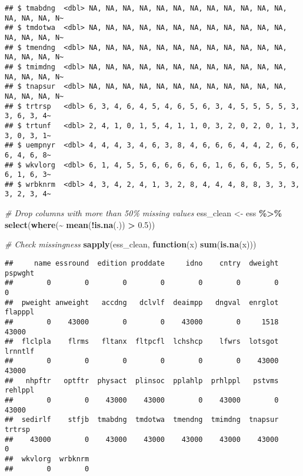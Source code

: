 \documentclass[
]{article}
\newenvironment{Shaded}{\begin{snugshade}}{\end{snugshade}}
\newcommand{\CommentTok}[1]{\textcolor[rgb]{0.56,0.35,0.01}{\textit{#1}}}
\newcommand{\ControlFlowTok}[1]{\textcolor[rgb]{0.13,0.29,0.53}{\textbf{#1}}}
\newcommand{\FloatTok}[1]{\textcolor[rgb]{0.00,0.00,0.81}{#1}}
\newcommand{\FunctionTok}[1]{\textcolor[rgb]{0.13,0.29,0.53}{\textbf{#1}}}
\newcommand{\NormalTok}[1]{#1}
\newcommand{\OtherTok}[1]{\textcolor[rgb]{0.56,0.35,0.01}{#1}}
\newcommand{\SpecialCharTok}[1]{\textcolor[rgb]{0.81,0.36,0.00}{\textbf{#1}}}
\begin{document}
\begin{verbatim}
## $ tmabdng  <dbl> NA, NA, NA, NA, NA, NA, NA, NA, NA, NA, NA, NA, NA, NA, NA, N~
## $ tmdotwa  <dbl> NA, NA, NA, NA, NA, NA, NA, NA, NA, NA, NA, NA, NA, NA, NA, N~
## $ tmendng  <dbl> NA, NA, NA, NA, NA, NA, NA, NA, NA, NA, NA, NA, NA, NA, NA, N~
## $ tmimdng  <dbl> NA, NA, NA, NA, NA, NA, NA, NA, NA, NA, NA, NA, NA, NA, NA, N~
## $ tnapsur  <dbl> NA, NA, NA, NA, NA, NA, NA, NA, NA, NA, NA, NA, NA, NA, NA, N~
## $ trtrsp   <dbl> 6, 3, 4, 6, 4, 5, 4, 6, 5, 6, 3, 4, 5, 5, 5, 5, 3, 3, 6, 3, 4~
## $ trtunf   <dbl> 2, 4, 1, 0, 1, 5, 4, 1, 1, 0, 3, 2, 0, 2, 0, 1, 3, 3, 0, 3, 1~
## $ uempnyr  <dbl> 4, 4, 4, 3, 4, 6, 3, 8, 4, 6, 6, 6, 4, 4, 2, 6, 6, 6, 4, 6, 8~
## $ wkvlorg  <dbl> 6, 1, 4, 5, 5, 6, 6, 6, 6, 6, 1, 6, 6, 6, 5, 5, 6, 6, 1, 6, 3~
## $ wrbknrm  <dbl> 4, 3, 4, 2, 4, 1, 3, 2, 8, 4, 4, 4, 8, 8, 3, 3, 3, 3, 2, 3, 4~
\end{verbatim}

\begin{Shaded}
\begin{Highlighting}[]
\CommentTok{\# Drop columns with more than 50\% missing values}
\NormalTok{ess\_clean }\OtherTok{\textless{}{-}}\NormalTok{ ess }\SpecialCharTok{\%\textgreater{}\%} \FunctionTok{select}\NormalTok{(}\FunctionTok{where}\NormalTok{(}\SpecialCharTok{\textasciitilde{}} \FunctionTok{mean}\NormalTok{(}\SpecialCharTok{!}\FunctionTok{is.na}\NormalTok{(.)) }\SpecialCharTok{\textgreater{}} \FloatTok{0.5}\NormalTok{))}

\CommentTok{\# Check missingness}
\FunctionTok{sapply}\NormalTok{(ess\_clean, }\ControlFlowTok{function}\NormalTok{(x) }\FunctionTok{sum}\NormalTok{(}\FunctionTok{is.na}\NormalTok{(x)))}
\end{Highlighting}
\end{Shaded}

\begin{verbatim}
##     name essround  edition proddate     idno    cntry  dweight  pspwght 
##        0        0        0        0        0        0        0        0 
##  pweight anweight   accdng   dclvlf  deaimpp   dngval  enrglot  flapppl 
##        0    43000        0        0    43000        0     1518    43000 
##  flclpla    flrms   fltanx  fltpcfl  lchshcp    lfwrs  lotsgot  lrnntlf 
##        0        0        0        0        0        0    43000    43000 
##   nhpftr   optftr  physact  plinsoc  pplahlp  prhlppl   pstvms  rehlppl 
##        0        0    43000    43000        0    43000        0    43000 
##  sedirlf    stfjb  tmabdng  tmdotwa  tmendng  tmimdng  tnapsur   trtrsp 
##    43000        0    43000    43000    43000    43000    43000        0 
##  wkvlorg  wrbknrm 
##        0        0
\end{verbatim}
\end{document}
